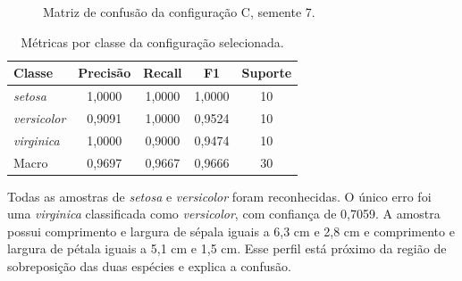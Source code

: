 \documentclass[12pt,a4paper,oneside,openany,chapter=TITLE,section=TITLE,subsection=TITLE,brazil]{abntex2}
\begin{document}
\begin{figure}[H]
\centering
{}
\caption{Matriz de confusão da configuração C, semente 7.}
\label{fig:confusao}
\end{figure}

\begin{table}[H]
\centering
\caption{Métricas por classe da configuração selecionada.}
\label{tab:metricas}
\begin{tabular}{lcccc}
\toprule
\textbf{Classe} & \textbf{Precisão} & \textbf{Recall} & \textbf{F1} & \textbf{Suporte} \\
\midrule
\textit{setosa} & 1,0000 & 1,0000 & 1,0000 & 10 \\
\textit{versicolor} & 0,9091 & 1,0000 & 0,9524 & 10 \\
\textit{virginica} & 1,0000 & 0,9000 & 0,9474 & 10 \\
\midrule
Macro & 0,9697 & 0,9667 & 0,9666 & 30 \\
\bottomrule
\end{tabular}
\end{table}

Todas as amostras de \textit{setosa} e \textit{versicolor} foram reconhecidas. O único erro foi uma \textit{virginica} classificada como \textit{versicolor}, com confiança de 0,7059. A amostra possui comprimento e largura de sépala iguais a 6,3 cm e 2,8 cm e comprimento e largura de pétala iguais a 5,1 cm e 1,5 cm. Esse perfil está próximo da região de sobreposição das duas espécies e explica a confusão.
\end{document}
